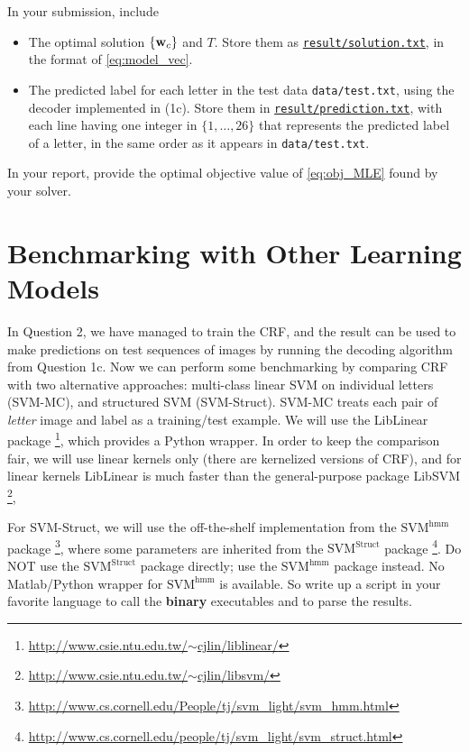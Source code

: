 \documentclass[11pt]{report}
\begin{document}
\begin{itemize}
		In your submission, include
		\begin{itemize}
			\item The optimal solution $\{\mathbf{\boldsymbol{w}}_c\}$ and $T$.  Store them as \underline{\tt{result/solution.txt}}, in the format of \eqref{eq:model_vec}.
			\item The predicted label for each letter in the test data \verb#data/test.txt#, using the decoder implemented in (1c).
			Store them in \underline{\tt{result/prediction.txt}},
			with each line having one integer in $\{1,\ldots, 26\}$ that represents the predicted label of a letter, in the same order as it appears in \verb#data/test.txt#.
		\end{itemize}
		In your report, provide the optimal objective value of \eqref{eq:obj_MLE} found by your solver.
	\end{itemize}
	
	
	\section{Benchmarking with Other Learning Models}
	
	In Question 2, we have managed to train the CRF,
	and the result can be used to make predictions on test sequences of images by running the decoding algorithm from Question 1c. 
	Now we can perform some benchmarking by comparing CRF with two alternative approaches:
	multi-class linear SVM on individual letters (SVM-MC),
	and structured SVM (SVM-Struct).
	SVM-MC treats each pair of \emph{letter} image and label as a training/test example.
	We will use the LibLinear package%
	\footnote{\href{http://www.csie.ntu.edu.tw/~cjlin/liblinear/}{http://www.csie.ntu.edu.tw/$\sim$cjlin/liblinear/}},
	which provides a Python wrapper.
	In order to keep the comparison fair,
	we will use linear kernels only (there are kernelized versions of CRF),
	and for linear kernels LibLinear is much faster than the general-purpose package LibSVM%
	\footnote{\href{http://www.csie.ntu.edu.tw/~cjlin/libsvm/}{http://www.csie.ntu.edu.tw/$\sim$cjlin/libsvm/}},
	
	
	For SVM-Struct, we will use the off-the-shelf implementation from the $\text{SVM}^{\text{hmm}}$ package%
	\footnote{\href{http://www.cs.cornell.edu/People/tj/svm_light/svm_hmm.html}{http://www.cs.cornell.edu/People/tj/svm\_light/svm\_hmm.html}},
	where some parameters are inherited from the $\text{SVM}^{\text{Struct}}$ package%
	\footnote{\href{http://www.cs.cornell.edu/people/tj/svm_light/svm_struct.html}{http://www.cs.cornell.edu/people/tj/svm\_light/svm\_struct.html}}.
	Do NOT use the $\text{SVM}^{\text{Struct}}$ package directly; 
	use the $\text{SVM}^{\text{hmm}}$ package instead.
	No Matlab/Python wrapper for $\text{SVM}^{\text{hmm}}$ is available.
	So write up a script in your favorite language to call the \textbf{binary} executables and to parse the results.
	
\end{document}
